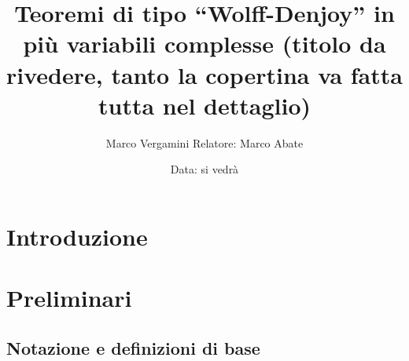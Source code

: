 \documentclass{article}
\title{Teoremi di tipo ``Wolff-Denjoy'' in più variabili complesse (titolo da rivedere, tanto la copertina va fatta tutta nel dettaglio)}
\author{Marco Vergamini Relatore: Marco Abate}
\date{Data: si vedrà}
\begin{document}
\maketitle
\newpage
\tableofcontents
\newpage


\section*{Introduzione}


\newpage

\section{Preliminari}
\subsection{Notazione e definizioni di base}

%

\newpage

%
%
%


%
%
%
\end{document}
